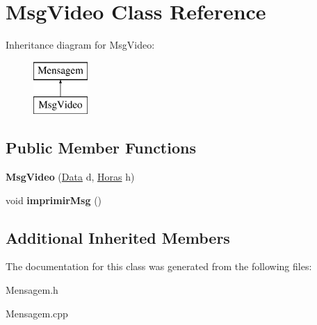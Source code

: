 \hypertarget{class_msg_video}{}\section{Msg\+Video Class Reference}
\label{class_msg_video}
Inheritance diagram for Msg\+Video\+:\begin{figure}[H]
\begin{center}
\leavevmode
\includegraphics[height=2.000000cm]{class_msg_video}
\end{center}
\end{figure}
\subsection*{Public Member Functions}
\begin{DoxyCompactItemize}
\item 
\hypertarget{class_msg_video_aef9a682492022a03ff4ea1ab62e1e1f9}{}{\bfseries Msg\+Video} (\hyperlink{class_data}{Data} d, \hyperlink{class_horas}{Horas} h)\label{class_msg_video_aef9a682492022a03ff4ea1ab62e1e1f9}

\item 
\hypertarget{class_msg_video_a9073f476d181d88e03c6cbf4c283533d}{}void {\bfseries imprimir\+Msg} ()\label{class_msg_video_a9073f476d181d88e03c6cbf4c283533d}

\end{DoxyCompactItemize}
\subsection*{Additional Inherited Members}


The documentation for this class was generated from the following files\+:\begin{DoxyCompactItemize}
\item 
Mensagem.\+h\item 
Mensagem.\+cpp\end{DoxyCompactItemize}
